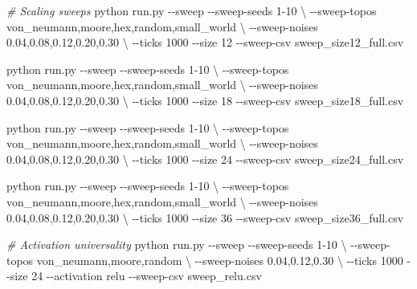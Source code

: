 \documentclass[
  11pt,
]{article}
\newenvironment{Shaded}{}{}
\newcommand{\AttributeTok}[1]{\textcolor[rgb]{0.49,0.56,0.16}{#1}}
\newcommand{\CommentTok}[1]{\textcolor[rgb]{0.38,0.63,0.69}{\textit{#1}}}
\newcommand{\DataTypeTok}[1]{\textcolor[rgb]{0.56,0.13,0.00}{#1}}
\newcommand{\ExtensionTok}[1]{#1}
\newcommand{\NormalTok}[1]{#1}
\begin{document}
\begin{Shaded}
\begin{Highlighting}[]
\CommentTok{\# Scaling sweeps}
\ExtensionTok{python}\NormalTok{ run.py }\AttributeTok{{-}{-}sweep} \AttributeTok{{-}{-}sweep{-}seeds}\NormalTok{ 1{-}10 }\DataTypeTok{\textbackslash{}}
  \AttributeTok{{-}{-}sweep{-}topos}\NormalTok{ von\_neumann,moore,hex,random,small\_world }\DataTypeTok{\textbackslash{}}
  \AttributeTok{{-}{-}sweep{-}noises}\NormalTok{ 0.04,0.08,0.12,0.20,0.30 }\DataTypeTok{\textbackslash{}}
  \AttributeTok{{-}{-}ticks}\NormalTok{ 1000 }\AttributeTok{{-}{-}size}\NormalTok{ 12 }\AttributeTok{{-}{-}sweep{-}csv}\NormalTok{ sweep\_size12\_full.csv}

\ExtensionTok{python}\NormalTok{ run.py }\AttributeTok{{-}{-}sweep} \AttributeTok{{-}{-}sweep{-}seeds}\NormalTok{ 1{-}10 }\DataTypeTok{\textbackslash{}}
  \AttributeTok{{-}{-}sweep{-}topos}\NormalTok{ von\_neumann,moore,hex,random,small\_world }\DataTypeTok{\textbackslash{}}
  \AttributeTok{{-}{-}sweep{-}noises}\NormalTok{ 0.04,0.08,0.12,0.20,0.30 }\DataTypeTok{\textbackslash{}}
  \AttributeTok{{-}{-}ticks}\NormalTok{ 1000 }\AttributeTok{{-}{-}size}\NormalTok{ 18 }\AttributeTok{{-}{-}sweep{-}csv}\NormalTok{ sweep\_size18\_full.csv}

\ExtensionTok{python}\NormalTok{ run.py }\AttributeTok{{-}{-}sweep} \AttributeTok{{-}{-}sweep{-}seeds}\NormalTok{ 1{-}10 }\DataTypeTok{\textbackslash{}}
  \AttributeTok{{-}{-}sweep{-}topos}\NormalTok{ von\_neumann,moore,hex,random,small\_world }\DataTypeTok{\textbackslash{}}
  \AttributeTok{{-}{-}sweep{-}noises}\NormalTok{ 0.04,0.08,0.12,0.20,0.30 }\DataTypeTok{\textbackslash{}}
  \AttributeTok{{-}{-}ticks}\NormalTok{ 1000 }\AttributeTok{{-}{-}size}\NormalTok{ 24 }\AttributeTok{{-}{-}sweep{-}csv}\NormalTok{ sweep\_size24\_full.csv}

\ExtensionTok{python}\NormalTok{ run.py }\AttributeTok{{-}{-}sweep} \AttributeTok{{-}{-}sweep{-}seeds}\NormalTok{ 1{-}10 }\DataTypeTok{\textbackslash{}}
  \AttributeTok{{-}{-}sweep{-}topos}\NormalTok{ von\_neumann,moore,hex,random,small\_world }\DataTypeTok{\textbackslash{}}
  \AttributeTok{{-}{-}sweep{-}noises}\NormalTok{ 0.04,0.08,0.12,0.20,0.30 }\DataTypeTok{\textbackslash{}}
  \AttributeTok{{-}{-}ticks}\NormalTok{ 1000 }\AttributeTok{{-}{-}size}\NormalTok{ 36 }\AttributeTok{{-}{-}sweep{-}csv}\NormalTok{ sweep\_size36\_full.csv}

\CommentTok{\# Activation universality}
\ExtensionTok{python}\NormalTok{ run.py }\AttributeTok{{-}{-}sweep} \AttributeTok{{-}{-}sweep{-}seeds}\NormalTok{ 1{-}10 }\DataTypeTok{\textbackslash{}}
  \AttributeTok{{-}{-}sweep{-}topos}\NormalTok{ von\_neumann,moore,random }\DataTypeTok{\textbackslash{}}
  \AttributeTok{{-}{-}sweep{-}noises}\NormalTok{ 0.04,0.12,0.30 }\DataTypeTok{\textbackslash{}}
  \AttributeTok{{-}{-}ticks}\NormalTok{ 1000 }\AttributeTok{{-}{-}size}\NormalTok{ 24 }\AttributeTok{{-}{-}activation}\NormalTok{ relu }\AttributeTok{{-}{-}sweep{-}csv}\NormalTok{ sweep\_relu.csv}


\end{Highlighting}
\end{Shaded}
\end{document}
